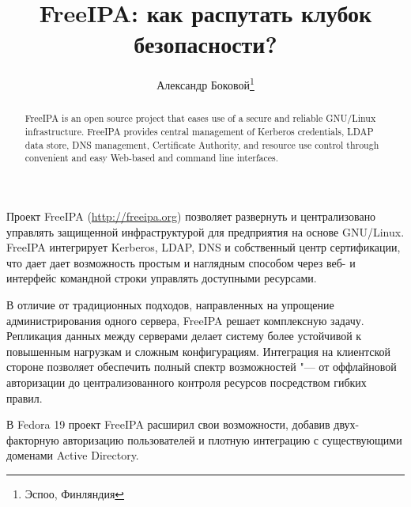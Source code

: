 \documentclass[10pt, a5paper]{article}
\begin{document}
\title{FreeIPA: как распутать клубок безопасности?}%

\author{Александр Боковой\footnote{Эспоо, Финляндия}}
\maketitle

\begin{abstract}
FreeIPA is an open source project that eases use of a secure and reliable GNU/Linux infrastructure. FreeIPA provides central management of Kerberos credentials, LDAP data store, DNS management, Certificate Authority, and resource use control through  convenient and easy Web-based and command line interfaces.
\end{abstract}

Проект FreeIPA (\url{http://freeipa.org}) позволяет развернуть и централизовано управлять защищенной инфраструктурой для предприятия на основе GNU/Linux. FreeIPA интегрирует Kerberos, \linebreak LDAP, DNS и собственный центр сертификации, что дает дает возможность  простым и наглядным способом через веб- и интерфейс командной строки управлять доступными ресурсами.

В отличие от традиционных подходов, направленных на упрощение администрирования одного сервера, FreeIPA решает комплексную задачу. Репликация данных между серверами делает систему более устойчивой к повышенным нагрузкам и сложным конфигурациям. Интеграция на клиентской стороне позволяет обеспечить полный спектр возможностей "--- от оффлайновой авторизации до централизованного контроля ресурсов посредством гибких правил.

В Fedora 19 проект FreeIPA расширил свои возможности,  добавив двух-факторную авторизацию пользователей и плотную интеграцию с существующими доменами Active Directory.
\end{document}
